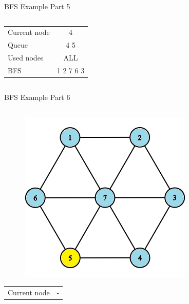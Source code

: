 \documentclass[aspectratio=169]{beamer}%
\begin{document}
\begin{frame}{BFS Example Part 5}
\begin{columns}
\begin{column}{0.32\textwidth}
\begin{figure}[!ht]
            \end{figure}
            \begin{table}[ht]
                \centering
                \begin{tabular}{l c}
                    Current node & 4\\
                    Queue & 4 5\\ 
                    Used nodes & ALL\\
                    BFS & 1 2 7 6 3
                \end{tabular}
            \end{table}
        \end{column}
    \end{columns}
\end{frame}

\begin{frame}{BFS Example Part 6}
    \begin{columns}
        \begin{column}{0.32\textwidth}
            \begin{figure}[!ht]
                \centering
                \includegraphics[width=0.9\linewidth]{bfs 16.png}
            \end{figure}
            \begin{table}[ht]
                \centering
                \begin{tabular}{l c}
                    Current node & -\\

\end{tabular}
\end{table}
\end{column}
\end{columns}
\end{frame}
\end{document}
